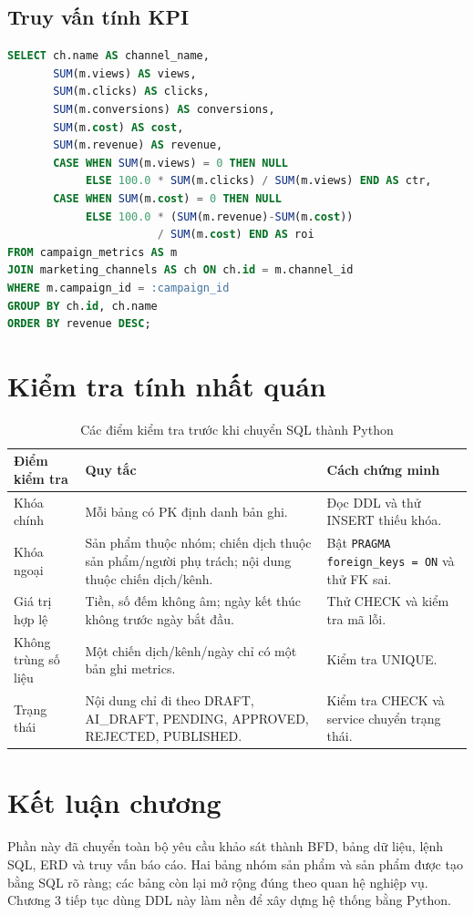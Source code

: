\subsection{Truy vấn tính KPI}

\begin{lstlisting}[language=SQL,caption={Tổng hợp KPI có xử lý mẫu số bằng 0}]
SELECT ch.name AS channel_name,
       SUM(m.views) AS views,
       SUM(m.clicks) AS clicks,
       SUM(m.conversions) AS conversions,
       SUM(m.cost) AS cost,
       SUM(m.revenue) AS revenue,
       CASE WHEN SUM(m.views) = 0 THEN NULL
            ELSE 100.0 * SUM(m.clicks) / SUM(m.views) END AS ctr,
       CASE WHEN SUM(m.cost) = 0 THEN NULL
            ELSE 100.0 * (SUM(m.revenue)-SUM(m.cost))
                       / SUM(m.cost) END AS roi
FROM campaign_metrics AS m
JOIN marketing_channels AS ch ON ch.id = m.channel_id
WHERE m.campaign_id = :campaign_id
GROUP BY ch.id, ch.name
ORDER BY revenue DESC;
\end{lstlisting}

\section{Kiểm tra tính nhất quán}

\begin{table}[h!]
\centering
\small
\caption{Các điểm kiểm tra trước khi chuyển SQL thành Python}
\begin{tabularx}{\textwidth}{|L{3.0cm}|Y|Y|}
\hline
\textbf{Điểm kiểm tra} & \textbf{Quy tắc} & \textbf{Cách chứng minh}\\\hline
Khóa chính & Mỗi bảng có PK định danh bản ghi. & Đọc DDL và thử INSERT thiếu khóa.\\\hline
Khóa ngoại & Sản phẩm thuộc nhóm; chiến dịch thuộc sản phẩm/người phụ trách; nội dung thuộc chiến dịch/kênh. & Bật \texttt{PRAGMA foreign\_keys = ON} và thử FK sai.\\\hline
Giá trị hợp lệ & Tiền, số đếm không âm; ngày kết thúc không trước ngày bắt đầu. & Thử CHECK và kiểm tra mã lỗi.\\\hline
Không trùng số liệu & Một chiến dịch/kênh/ngày chỉ có một bản ghi metrics. & Kiểm tra UNIQUE.\\\hline
Trạng thái & Nội dung chỉ đi theo DRAFT, AI\_DRAFT, PENDING, APPROVED, REJECTED, PUBLISHED. & Kiểm tra CHECK và service chuyển trạng thái.\\\hline
\end{tabularx}
\end{table}

\section{Kết luận chương}

Phần này đã chuyển toàn bộ yêu cầu khảo sát thành BFD, bảng dữ liệu, lệnh SQL, ERD và truy vấn báo cáo. Hai bảng nhóm sản phẩm và sản phẩm được tạo bằng SQL rõ ràng; các bảng còn lại mở rộng đúng theo quan hệ nghiệp vụ. Chương 3 tiếp tục dùng DDL này làm nền để xây dựng hệ thống bằng Python.
